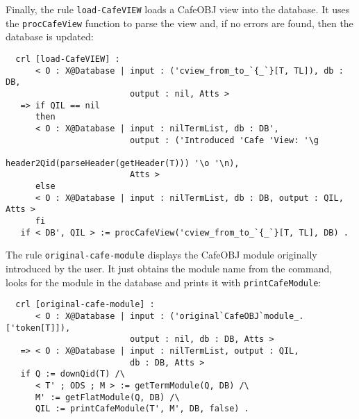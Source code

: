Finally, the rule \verb"load-CafeVIEW" loads a CafeOBJ view into the database.
It uses the \verb"procCafeView" function to parse the view and, if no errors are
found, then the database is updated:

{\codesize
\begin{verbatim}
  crl [load-CafeVIEW] :
      < O : X@Database | input : ('cview_from_to_`{_`}[T, TL]), db : DB,
                         output : nil, Atts >
   => if QIL == nil
      then
      < O : X@Database | input : nilTermList, db : DB',
                         output : ('Introduced 'Cafe 'View: '\g
                                   header2Qid(parseHeader(getHeader(T))) '\o '\n),
                         Atts >
      else
      < O : X@Database | input : nilTermList, db : DB, output : QIL, Atts >
      fi
   if < DB', QIL > := procCafeView('cview_from_to_`{_`}[T, TL], DB) .
\end{verbatim}
}

{\codesize
\begin{comment}
  crl [load-open-close-block] :
      < O : X@Database | input : ('copen_._close[T, T']), db : DB,
                         output : nil, Atts >
   => if QIL == nil
      then
      < O : X@Database | input : nilTermList, db : DB',
                         output : ('Introduced 'Cafe 'View: '\g
                                   header2Qid(parseHeader(getHeader(T))) '\o '\n),
                         Atts >
      else
      < O : X@Database | input : nilTermList, db : DB, output : QIL, Atts >
      fi
   if < DB', QIL > := procOpenCloseEnv(T, T', DB) .
\end{comment}
}

The rule \verb"original-cafe-module" displays the CafeOBJ module originally
introduced by the user. It just obtains the module name from the command,
looks for the module in the database and prints it with \texttt{printCafeModule}:


{\codesize
\begin{verbatim}
  crl [original-cafe-module] :
      < O : X@Database | input : ('original`CafeOBJ`module_.['token[T]]),
                         output : nil, db : DB, Atts >
   => < O : X@Database | input : nilTermList, output : QIL,
                         db : DB, Atts >
   if Q := downQid(T) /\
      < T' ; ODS ; M > := getTermModule(Q, DB) /\
      M' := getFlatModule(Q, DB) /\
      QIL := printCafeModule(T', M', DB, false) .
\end{verbatim}
}

